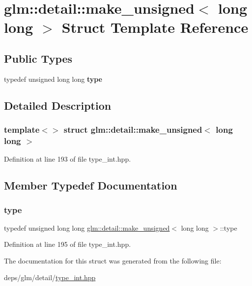 \hypertarget{structglm_1_1detail_1_1make__unsigned_3_01long_01long_01_4}{}\section{glm\+:\+:detail\+:\+:make\+\_\+unsigned$<$ long long $>$ Struct Template Reference}
\label{structglm_1_1detail_1_1make__unsigned_3_01long_01long_01_4}
\subsection*{Public Types}
\begin{DoxyCompactItemize}
\item 
\mbox{\label{structglm_1_1detail_1_1make__unsigned_3_01long_01long_01_4_adb9a738bcdd4b53058383168bb8585b1}} 
typedef unsigned long long {\bfseries type}
\end{DoxyCompactItemize}


\subsection{Detailed Description}
\subsubsection*{template$<$$>$\newline
struct glm\+::detail\+::make\+\_\+unsigned$<$ long long $>$}



Definition at line 193 of file type\+\_\+int.\+hpp.



\subsection{Member Typedef Documentation}
\mbox{\label{structglm_1_1detail_1_1make__unsigned_3_01long_01long_01_4_adb9a738bcdd4b53058383168bb8585b1}} 
\subsubsection{\texorpdfstring{type}{type}}
{\footnotesize\ttfamily typedef unsigned long long \hyperlink{structglm_1_1detail_1_1make__unsigned}{glm\+::detail\+::make\+\_\+unsigned}$<$ long long $>$\+::type}



Definition at line 195 of file type\+\_\+int.\+hpp.



The documentation for this struct was generated from the following file\+:\begin{DoxyCompactItemize}
\item 
deps/glm/detail/\hyperlink{type__int_8hpp}{type\+\_\+int.\+hpp}\end{DoxyCompactItemize}
